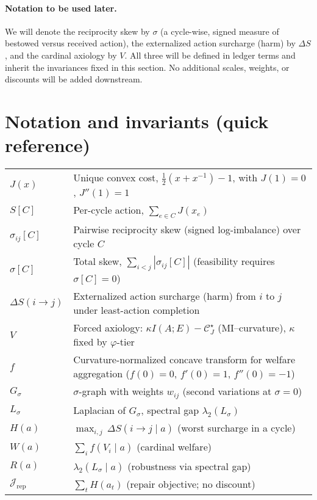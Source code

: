 \documentclass[11pt]{article}
\begin{document}
\paragraph{Notation to be used later.}
We will denote the reciprocity skew by $\sigma$ (a cycle-wise, signed measure of bestowed versus received action), the externalized action surcharge (harm) by $\Delta S$, and the cardinal axiology by $V$. All three will be defined in ledger terms and inherit the invariances fixed in this section. No additional scales, weights, or discounts will be added downstream.

\section*{Notation and invariants (quick reference)}
\begin{center}
\begin{tabular}{ll}
$J(x)$ & Unique convex cost, $\tfrac12(x+x^{-1})-1$, with $J(1)=0$, $J''(1)=1$ \\
$S[C]$ & Per-cycle action, $\sum_{e\in C} J(x_e)$ \\
$\sigma_{ij}[C]$ & Pairwise reciprocity skew (signed log-imbalance) over cycle $C$ \\
$\sigma[C]$ & Total skew, $\sum_{i<j}|\sigma_{ij}[C]|$ (feasibility requires $\sigma[C]=0$) \\
$\Delta S(i\!\to\! j)$ & Externalized action surcharge (harm) from $i$ to $j$ under least-action completion \\
$V$ & Forced axiology: $\kappa I(A;E)-\mathcal{C}_J^\star$ (MI–curvature), $\kappa$ fixed by $\varphi$-tier \\
$f$ & Curvature-normalized concave transform for welfare aggregation ($f(0)=0$, $f'(0)=1$, $f''(0)=-1$) \\
$G_\sigma$ & $\sigma$-graph with weights $w_{ij}$ (second variations at $\sigma=0$) \\
$L_\sigma$ & Laplacian of $G_\sigma$, spectral gap $\lambda_2(L_\sigma)$ \\
$H(a)$ & $\max_{i,j}\,\Delta S(i\!\to\! j\mid a)$ (worst surcharge in a cycle) \\
$W(a)$ & $\sum_i f(V_i\mid a)$ (cardinal welfare) \\
$R(a)$ & $\lambda_2(L_\sigma\mid a)$ (robustness via spectral gap) \\
$\mathcal{J}_{\mathrm{rep}}$ & $\sum_t H(a_t)$ (repair objective; no discount) \\
\end{tabular}
\end{center}
\end{document}

